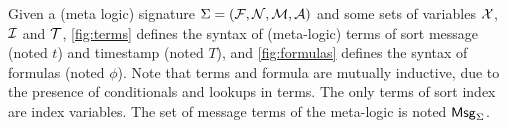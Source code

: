 \begin{definition}
  Given a (meta logic) signature $\Sigma = (\mathcal{F},\mathcal{N},\mathcal{M},\mathcal{A})$
  and some sets of variables
  $\mathcal{X}$, $\mathcal{I}$ and $\mathcal{T}$,
  \cref{fig:terms} defines the syntax of (meta-logic) terms
  of sort message (noted $t$) and timestamp (noted $T$),
  and \cref{fig:formulas} defines the syntax of formulas (noted $\phi$).
  Note that terms and formula are mutually inductive, due to the presence
  of conditionals and lookups in terms.
  The only terms of sort index are index variables.
  The set of message terms of the meta-logic is noted $\mathsf{Msg}_\Sigma$.
\end{definition}
